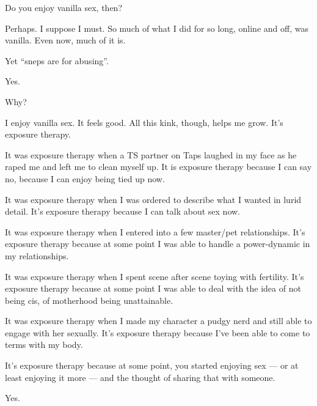 \begin{ally}
Do you enjoy vanilla sex, then?
\end{ally}
Perhaps. I suppose I must. So much of what I did for so long, online and off, was vanilla. Even now, much of it is.

\begin{ally}
Yet ``sneps are for abusing''.
\end{ally}
Yes.

\begin{ally}
Why?
\end{ally}
I enjoy vanilla sex. It feels good. All this kink, though, helps me grow. It's exposure therapy.

It was exposure therapy when a TS partner on Taps laughed in my face as he raped me and left me to clean myself up. It is exposure therapy because I can say no, because I can enjoy being tied up now.

It was exposure therapy when I was ordered to describe what I wanted in lurid detail. It's exposure therapy because I can talk about sex now.

It was exposure therapy when I entered into a few master/pet relationships. It's exposure therapy because at some point I was able to handle a power-dynamic in my relationships.

It was exposure therapy when I spent scene after scene toying with fertility. It's exposure therapy because at some point I was able to deal with the idea of not being cis, of motherhood being unattainable.

It was exposure therapy when I made my character a pudgy nerd and still able to engage with her sexually. It's exposure therapy because I've been able to come to terms with my body.

\begin{ally}
It's exposure therapy because at some point, you started enjoying sex --- or at least enjoying it more --- and the thought of sharing that with someone.
\end{ally}
Yes.
\newpage
{}
